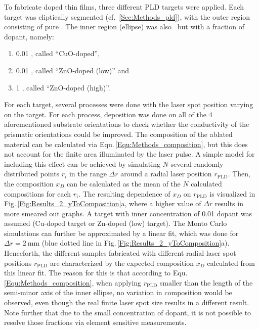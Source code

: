 To fabricate doped thin films, three different PLD targets were applied.
Each target was eliptically segmented (cf.~\ref{Sec:Methods_pld}), with the outer region consisting of pure .
The inner region (ellipse) was also \cro\ but with a fraction of dopant, namely:
\begin{enumerate}
    \item \qty{0.01}{\wtpercent} , called \enquote{CuO-doped},
    \item \qty{0.01}{\wtpercent} , called \enquote{ZnO-doped (low)} and
    \item \qty{1}{\wtpercent} , called \enquote{ZnO-doped (high)}.
\end{enumerate}
For each target, several processes were done with the laser spot position varying on the target.
For each process, deposition was done on all of the 4 aforementioned substrate orientations to check whether the conductivity of the prismatic orientations could be improved.
The composition of the ablated material can be calculated via Equ.\,\ref{Equ:Methods_composition}, but this does not account for the finite area illuminated by the laser pulse.
A simple model for including this effect can be achieved by simulating $N$ several randomly distributed points $r_i$ in the range $\Delta r$ around a radial laser position $r_\mathrm{PLD}$.
Then, the composition $x_D$ can be calculated as the mean of the $N$ calculated compositions for each $r_i$.
The resulting dependence of $x_D$ on $r_\mathrm{PLD}$ is visualized in Fig.\,\ref{Fig:Results_2_yToComposition}a, where a higher value of $\Delta r$ results in more smeared out graphs.
A target with inner concentration of \qty{0.01}{\wtpercent} dopant was assumed (Cu-doped target or Zn-doped (low) target).
The Monto Carlo simulations can further be approximated by a linear fit, which was done for $\Delta r=\qty{2}{\mm}$ (blue dotted line in Fig.\,\ref{Fig:Results_2_yToComposition}a).
Henceforth, the different samples fabricated with different radial laser spot positions $r_\mathrm{PLD}$ are characterized by the expected composition $x_D$ calculated from this linear fit.
The reason for this is that according to Equ.\,\ref{Equ:Methods_composition}, when applying $r_\mathrm{PLD}$ smaller than the length of the semi-minor axis of the inner ellipse, no variation in composition would be observed, even though the real finite laser spot size results in a different result.
Note further that due to the small concentration of dopant, it is not possible to resolve those fractions via element sensitive measurements.
